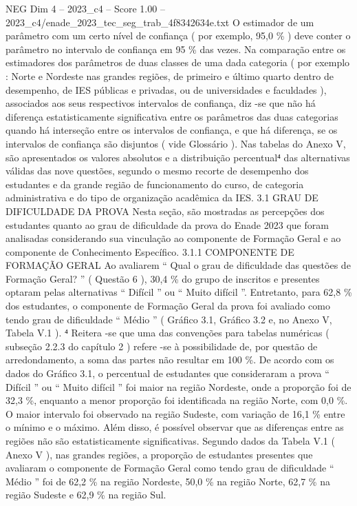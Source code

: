 \begin{textsample}{NEG Dim 4 – 2023\_c4 – Score 1.00 – 2023\_c4/enade\_2023\_tec\_seg\_trab\_4f8342634e.txt}
O estimador de um parâmetro com um certo nível de confiança ( por exemplo, 95,0 \% ) deve conter o parâmetro no intervalo de confiança em 95 \% das vezes.
Na comparação entre os estimadores dos parâmetros de duas classes de uma dada categoria ( por exemplo : Norte e Nordeste nas grandes regiões, de primeiro e último quarto dentro de desempenho, de IES públicas e privadas, ou de universidades e faculdades ), associados aos seus respectivos intervalos de confiança, diz -se que não há diferença estatisticamente significativa entre os parâmetros das duas categorias quando há interseção entre os intervalos de confiança, e que há diferença, se os intervalos de confiança são disjuntos ( vide Glossário ).
Nas tabelas do Anexo V, são apresentados os valores absolutos e a distribuição percentual⁴ das alternativas válidas das nove questões, segundo o mesmo recorte de desempenho dos estudantes e da grande região de funcionamento do curso, de categoria administrativa e do tipo de organização acadêmica da IES. 3.1 GRAU DE DIFICULDADE DA PROVA Nesta seção, são mostradas as percepções dos estudantes quanto ao grau de dificuldade da prova do Enade 2023 que foram analisadas considerando sua vinculação ao componente de Formação Geral e ao componente de Conhecimento Específico. 3.1.1 COMPONENTE DE FORMAÇÃO GERAL Ao avaliarem “ Qual o grau de dificuldade das questões de Formação Geral? ” ( Questão 6 ), 30,4 \% do grupo de inscritos e presentes optaram pelas alternativas “ Difícil ” ou “ Muito difícil ”.
Entretanto, para 62,8 \% dos estudantes, o componente de Formação Geral da prova foi avaliado como tendo grau de dificuldade “ Médio ” ( Gráfico 3.1, Gráfico 3.2 e, no Anexo V, Tabela V.1 ). ⁴ Reitera -se que uma das convenções para tabelas numéricas ( subseção 2.2.3 do capítulo 2 ) refere -se à possibilidade de, por questão de arredondamento, a soma das partes não resultar em 100 \%.
De acordo com os dados do Gráfico 3.1, o percentual de estudantes que consideraram a prova “ Difícil ” ou “ Muito difícil ” foi maior na região Nordeste, onde a proporção foi de 32,3 \%, enquanto a menor proporção foi identificada na região Norte, com 0,0 \%.
O maior intervalo foi observado na região Sudeste, com variação de 16,1 \% entre o mínimo e o máximo.
Além disso, é possível observar que as diferenças entre as regiões não são estatisticamente significativas.
Segundo dados da Tabela V.1 ( Anexo V ), nas grandes regiões, a proporção de estudantes presentes que avaliaram o componente de Formação Geral como tendo grau de dificuldade “ Médio ” foi de 62,2 \% na região Nordeste, 50,0 \% na região Norte, 62,7 \% na região Sudeste e 62,9 \% na região Sul.

\end{textsample}

